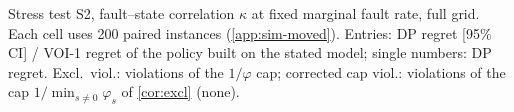 \begin{table}[!htbp]
\centering
\caption{Stress test S2, fault--state correlation $\kappa$ at fixed marginal fault rate, full grid. Each cell uses 200 paired instances (\cref{app:sim-moved}). Entries: DP regret [95\% CI] / VOI-1 regret of the policy built on the stated model; single numbers: DP regret. Excl.\ viol.: violations of the $1/\varphi$ cap; corrected cap viol.: violations of the cap $1/\min_{s\ne0}\varphi_s$ of \cref{cor:excl} (none).}
\label{tab:s2-full}
\scriptsize
\setlength{\tabcolsep}{3pt}
\resizebox{\linewidth}{!}{}
\end{table}
